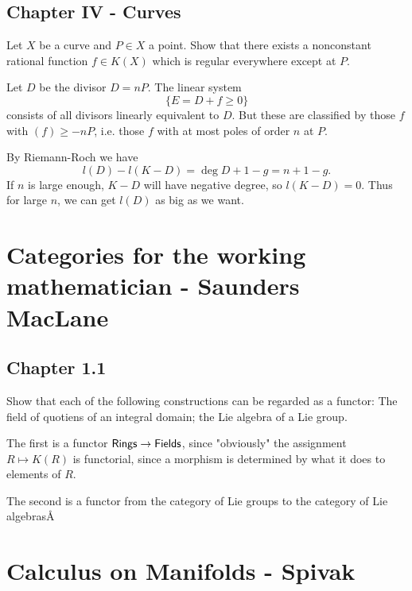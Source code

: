 \documentclass[11pt, english]{article}
\begin{document}
\subsection{Chapter IV - Curves}

\begin{exc}[Exercise 1.1]
Let $X$ be a curve and $P \in X$ a point. Show that there exists a nonconstant rational function $f \in K(X)$ which is regular everywhere except at $P$.
\end{exc}
\begin{sol}
Let $D$ be the divisor $D=nP$. The linear system 
$$
\{ E = D + f \geq 0 \}
$$
consists of all divisors linearly equivalent to $D$. But these are classified by those $f$ with $(f) \geq -nP$, i.e. those $f$ with at most poles of order $n$ at $P$.

By Riemann-Roch we have
$$
l(D)-l(K-D) = \deg D +1 -g = n+1-g.
$$
If $n$ is large enough, $K-D$ will have negative degree, so $l(K-D)=0$. Thus for large $n$, we can get $l(D)$ as big as we want.

\end{sol}
\section{Categories for the working mathematician - Saunders MacLane}
\subsection{Chapter 1.1}

\begin{exc}[1.1]
Show that each of the following constructions can be regarded as a functor: The field of quotiens of an integral domain; the Lie algebra of a Lie group.
\end{exc}
\begin{sol}
The first is a functor $\mathsf{Rings} \to \mathsf{Fields}$, since "obviously" the assignment $R \mapsto K(R)$ is functorial, since a morphism is determined by what it does to elements of $R$.

The second is a functor from the category of Lie groups to the category of Lie algebrasÅ
\end{sol}




\section{Calculus on Manifolds - Spivak}
\end{document}
